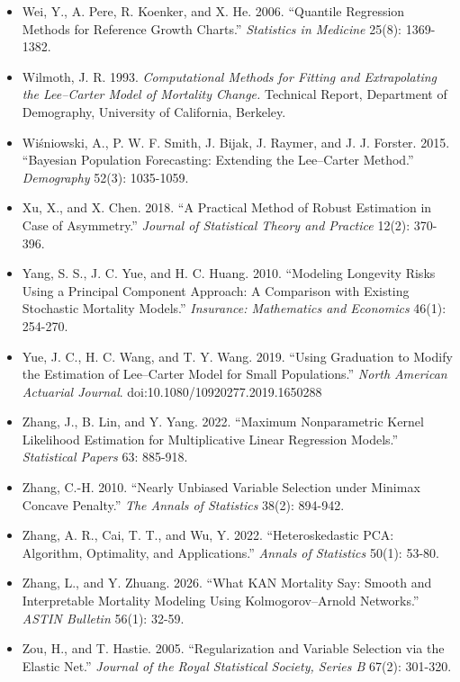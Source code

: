 \documentclass[UTF8, fontset=macnew, a4paper, 12pt]{ctexart}
\begin{document}
\begin{itemize}[leftmargin=2em, label={}, itemsep=3pt]
  \item[] Wei, Y., A. Pere, R. Koenker, and X. He. 2006. ``Quantile Regression
        Methods for Reference Growth Charts.'' \textit{Statistics in Medicine}
        25(8): 1369-1382.
  \item[] Wilmoth, J. R. 1993. \textit{Computational Methods for Fitting and
        Extrapolating the Lee--Carter Model of Mortality Change.} Technical
        Report, Department of Demography, University of California, Berkeley.
  \item[] Wi\'sniowski, A., P. W. F. Smith, J. Bijak, J. Raymer, and
        J. J. Forster. 2015. ``Bayesian Population Forecasting: Extending the
        Lee--Carter Method.'' \textit{Demography} 52(3): 1035-1059.
  \item[] Xu, X., and X. Chen. 2018. ``A Practical Method of Robust Estimation
        in Case of Asymmetry.'' \textit{Journal of Statistical Theory and
        Practice} 12(2): 370-396.
  \item[] Yang, S. S., J. C. Yue, and H. C. Huang. 2010. ``Modeling Longevity
        Risks Using a Principal Component Approach: A Comparison with Existing
        Stochastic Mortality Models.''
        \textit{Insurance: Mathematics and Economics} 46(1): 254-270.
  \item[] Yue, J. C., H. C. Wang, and T. Y. Wang. 2019. ``Using Graduation to
        Modify the Estimation of Lee--Carter Model for Small Populations.''
        \textit{North American Actuarial Journal}.
        doi:10.1080/10920277.2019.1650288
  \item[] Zhang, J., B. Lin, and Y. Yang. 2022. ``Maximum Nonparametric Kernel
        Likelihood Estimation for Multiplicative Linear Regression Models.''
        \textit{Statistical Papers} 63: 885-918.
  \item[] Zhang, C.-H. 2010. ``Nearly Unbiased Variable Selection under
        Minimax Concave Penalty.'' \textit{The Annals of Statistics}
        38(2): 894-942.
  \item[] Zhang, A. R., Cai, T. T., and Wu, Y. 2022. ``Heteroskedastic PCA: Algorithm,
        Optimality, and Applications.'' \textit{Annals of Statistics} 50(1): 53-80.
  \item[] Zhang, L., and Y. Zhuang. 2026. ``What KAN Mortality Say: Smooth and
        Interpretable Mortality Modeling Using Kolmogorov--Arnold Networks.''
        \textit{ASTIN Bulletin} 56(1): 32-59.
  \item[] Zou, H., and T. Hastie. 2005. ``Regularization and Variable Selection
        via the Elastic Net.'' \textit{Journal of the Royal Statistical
        Society, Series B} 67(2): 301-320.


\end{itemize}
\end{document}
